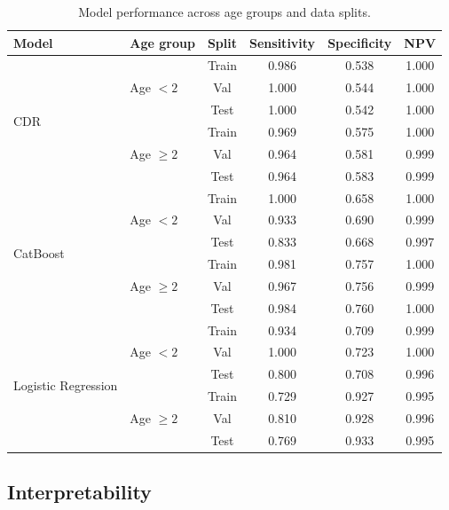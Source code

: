 \documentclass[10pt,letterpaper]{article}
\begin{document}
\renewcommand{\arraystretch}{0.85}
\begin{table}[htbp]
\centering
\small
\caption{Model performance across age groups and data splits.}
\label{tab:performance}
\begin{tabular}{llcccc}
\toprule
Model & Age group & Split & Sensitivity & Specificity & NPV \\
\midrule

\multirow{6}{*}{CDR}
& \multirow{3}{*}{Age $< 2$}
    & Train & 0.986 & 0.538 & 1.000 \\
&   & Val   & 1.000 & 0.544 & 1.000 \\
&   & Test  & 1.000 & 0.542 & 1.000 \\
\cmidrule(lr){2-6}
& \multirow{3}{*}{Age $\geq 2$}
    & Train & 0.969 & 0.575 & 1.000 \\
&   & Val   & 0.964 & 0.581 & 0.999 \\
&   & Test  & 0.964 & 0.583 & 0.999 \\

\midrule

\multirow{6}{*}{CatBoost}
& \multirow{3}{*}{Age $< 2$}
    & Train & 1.000 & 0.658 & 1.000 \\
&   & Val   & 0.933 & 0.690 & 0.999 \\
&   & Test  & 0.833 & 0.668 & 0.997 \\
\cmidrule(lr){2-6}
& \multirow{3}{*}{Age $\geq 2$}
    & Train & 0.981 & 0.757 & 1.000 \\
&   & Val   & 0.967 & 0.756 & 0.999 \\
&   & Test  & 0.984 & 0.760 & 1.000 \\

\midrule

\multirow{6}{*}{Logistic Regression}
& \multirow{3}{*}{Age $< 2$}
    & Train & 0.934 & 0.709 & 0.999 \\
&   & Val   & 1.000 & 0.723 & 1.000 \\
&   & Test  & 0.800 & 0.708 & 0.996 \\
\cmidrule(lr){2-6}
& \multirow{3}{*}{Age $\geq 2$}
    & Train & 0.729 & 0.927 & 0.995 \\
&   & Val   & 0.810 & 0.928 & 0.996 \\
&   & Test  & 0.769 & 0.933 & 0.995 \\

\bottomrule
\end{tabular}
\end{table}

\subsection{Interpretability}
\end{document}
